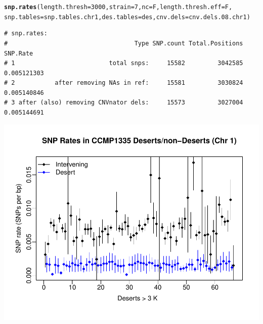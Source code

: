 \documentclass{article}\usepackage[]{graphicx}\usepackage[]{color}
\makeatletter
\def\maxwidth{ %
  \ifdim\Gin@nat@width>\linewidth
    \linewidth
  \else
    \Gin@nat@width
  \fi
}
\newcommand{\hlnum}[1]{\textcolor[rgb]{0.686,0.059,0.569}{#1}}%
\newcommand{\hlstd}[1]{\textcolor[rgb]{0.345,0.345,0.345}{#1}}%
\newcommand{\hlkwc}[1]{\textcolor[rgb]{0.333,0.667,0.333}{#1}}%
\newcommand{\hlkwd}[1]{\textcolor[rgb]{0.737,0.353,0.396}{\textbf{#1}}}%
\newenvironment{kframe}{%
 \def\at@end@of@kframe{}%
 \ifinner\ifhmode%
  \def\at@end@of@kframe{\end{minipage}}%
  \begin{minipage}{\columnwidth}%
 \fi\fi%
 \def\FrameCommand##1{\hskip\@totalleftmargin \hskip-\fboxsep
 \colorbox{shadecolor}{##1}\hskip-\fboxsep
     \hskip-\linewidth \hskip-\@totalleftmargin \hskip\columnwidth}%
 \MakeFramed {\advance\hsize-\width
   \@totalleftmargin\z@ \linewidth\hsize
   \@setminipage}}%
 {\par\unskip\endMakeFramed%
 \at@end@of@kframe}
\newenvironment{knitrout}{}{} %
\makeatother
\begin{document}
\begin{knitrout}\scriptsize
{}\color{fgcolor}\begin{kframe}
\begin{alltt}
\hlkwd{snp.rates}\hlstd{(}\hlkwc{length.thresh}\hlstd{=}\hlnum{3000}\hlstd{,} \hlkwc{strain}\hlstd{=}\hlnum{7}\hlstd{,} \hlkwc{nc}\hlstd{=F,} \hlkwc{length.thresh.eff}\hlstd{=F,}
          \hlkwc{snp.tables}\hlstd{=snp.tables.chr1,} \hlkwc{des.tables}\hlstd{=des,} \hlkwc{cnv.dels}\hlstd{=cnv.dels.08.chr1)}
\end{alltt}
\begin{verbatim}
# snp.rates:
#                                   Type SNP.count Total.Positions    SNP.Rate
# 1                          total snps:     15582         3042585 0.005121303
# 2           after removing NAs in ref:     15581         3030824 0.005140846
# 3 after (also) removing CNVnator dels:     15573         3027004 0.005144691
\end{verbatim}
\end{kframe}

{\centering \includegraphics[width=\maxwidth]{figs-knitr/ny-coding-3k-o-1} 

}



\end{knitrout}
\end{document}

